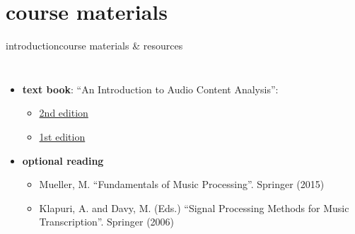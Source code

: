     \section[course materials]{course materials}
        \begin{frame}{introduction}{course materials \& resources}
            \vspace{-4mm}
            \begin{columns}[T]
                    \begin{itemize}
                        \item   \textbf{text book}: ``An Introduction to Audio Content Analysis'':
                        
                            
                            \begin{itemize}
                                \item   \href{\IEEELink}{2nd edition}
                                \item   \href{https://ieeexplore.ieee.org/servlet/opac?bknumber=6266785}{1st edition}
                            \end{itemize}

                        \smallskip
                        \item<2->  \textbf{optional reading}
                            
                            \begin{itemize}
                                \item   \footnotesize Mueller, M. ``Fundamentals of Music Processing''. Springer (2015)
                                \item   \footnotesize Klapuri, A. and Davy, M. (Eds.) ``Signal Processing Methods for Music Transcription''. Springer (2006)
                            \end{itemize}
                            \normalsize


\end{itemize}
\end{columns}
\end{frame}
